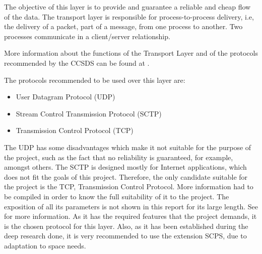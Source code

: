 The objective of this layer is to provide and guarantee a reliable and cheap flow of the data. The transport layer is responsible for process-to-process delivery, i.e, the delivery of a packet, part of a message, from one process to another. Two processes communicate in a client/server relationship. 

More information about the functions of the Transport Layer and of the protocols recommended by the CCSDS can be found at \cite[Chapter 1, Section 3]{annex3}.

The protocols recommended to be used over this layer are:

\begin{itemize}
\item User Datagram Protocol (UDP)
\item Stream Control Transmission Protocol (SCTP)
\item Transmission Control Protocol (TCP)
\end{itemize}

The UDP has some disadvantages which make it not suitable for the purpose of the project, such as the fact that no reliability is guaranteed, for example, amongst others. The SCTP is designed mostly for Internet applications, which does not fit the goals of this project. Therefore, the only candidate suitable for the project is the TCP, Transmission Control Protocol. More information had to be compiled in order to know the full suitability of it to the project. The exposition of all its parameters is not shown in this report for its large length. See \cite[Chapter 1, Section 3]{annex3} for more information.  As it has the required features that the project demands, it is the chosen protocol for this layer. Also, as it has been established during the deep research done, it is very recommended to use the extension SCPS, due to adaptation to space needs.  